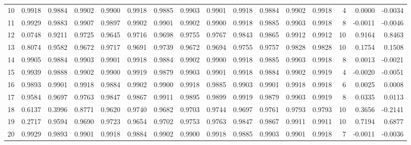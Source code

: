 \begin{tabular}{lrrrrrrrrrrrrrrr}
10  &      0.9918 &  0.9884 &  0.9902 &  0.9900 &  0.9918 &  0.9885 &  0.9903 &  0.9901 &  0.9918 &  0.9884 &   0.9902 &     0.9918 &      4 &                    0.0000 &                    -0.0034 \\
11  &      0.9929 &  0.9883 &  0.9907 &  0.9897 &  0.9902 &  0.9901 &  0.9902 &  0.9900 &  0.9918 &  0.9885 &   0.9903 &     0.9918 &      8 &                   -0.0011 &                    -0.0046 \\
12  &      0.0748 &  0.9211 &  0.9725 &  0.9645 &  0.9716 &  0.9698 &  0.9755 &  0.9767 &  0.9843 &  0.9865 &   0.9912 &     0.9912 &     10 &                    0.9164 &                     0.8463 \\
13  &      0.8074 &  0.9582 &  0.9672 &  0.9717 &  0.9691 &  0.9739 &  0.9672 &  0.9694 &  0.9755 &  0.9757 &   0.9828 &     0.9828 &     10 &                    0.1754 &                     0.1508 \\
14  &      0.9905 &  0.9884 &  0.9903 &  0.9901 &  0.9918 &  0.9884 &  0.9902 &  0.9900 &  0.9918 &  0.9885 &   0.9903 &     0.9918 &      8 &                    0.0013 &                    -0.0021 \\
15  &      0.9939 &  0.9888 &  0.9902 &  0.9900 &  0.9919 &  0.9879 &  0.9903 &  0.9901 &  0.9918 &  0.9884 &   0.9902 &     0.9919 &      4 &                   -0.0020 &                    -0.0051 \\
16  &      0.9893 &  0.9901 &  0.9918 &  0.9884 &  0.9902 &  0.9900 &  0.9918 &  0.9885 &  0.9903 &  0.9901 &   0.9918 &     0.9918 &      6 &                    0.0025 &                     0.0008 \\
17  &      0.9584 &  0.9697 &  0.9763 &  0.9847 &  0.9867 &  0.9911 &  0.9895 &  0.9899 &  0.9919 &  0.9879 &   0.9903 &     0.9919 &      8 &                    0.0335 &                     0.0113 \\
18  &      0.6137 &  0.3996 &  0.8771 &  0.9620 &  0.9740 &  0.9682 &  0.9703 &  0.9744 &  0.9697 &  0.9761 &   0.9793 &     0.9793 &     10 &                    0.3656 &                    -0.2141 \\
19  &      0.2717 &  0.9594 &  0.9690 &  0.9723 &  0.9654 &  0.9702 &  0.9753 &  0.9763 &  0.9847 &  0.9867 &   0.9911 &     0.9911 &     10 &                    0.7194 &                     0.6877 \\
20  &      0.9929 &  0.9893 &  0.9901 &  0.9918 &  0.9884 &  0.9902 &  0.9900 &  0.9918 &  0.9885 &  0.9903 &   0.9901 &     0.9918 &      7 &                   -0.0011 &                    -0.0036 \\

\end{tabular}
